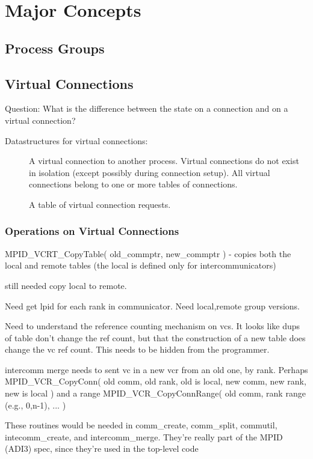 \documentclass{report}
\begin{document}
\section{Major Concepts}

\subsection{Process Groups}

\subsection{Virtual Connections}
Question: What is the difference between the state on a connection and
on a virtual connection?

Datastructures for virtual connections:
\begin{description}
\item[\texttt{MPIDI\_VC\_t]A virtual connection to another process.
Virtual connections do not exist in isolation (except possibly during
connection setup).  All virtual connections belong to one or more tables of
connections.
\item[\texttt{MPIDI\_VCR]A table of virtual connection requests.  
\end{description}

\subsubsection{Operations on Virtual Connections}
MPID\_VCRT\_CopyTable( old\_commptr, new\_commptr ) - copies both the
local and remote tables (the local is defined only for
intercommunicators)

still needed copy local to remote.

Need get lpid for each rank in communicator.  Need local,remote group
versions.

Need to understand the reference counting mechanism on vcs.  It looks
like dups of table don't change the ref count, but that the
construction of a new table does change the vc ref count.  This needs
to be hidden from the programmer.

intercomm merge needs to sent vc in a new vcr from an old one, by
rank.
Perhaps MPID\_VCR\_CopyConn( old comm, old rank, old is local, 
                             new comm, new rank, new is local )
and a range
        MPID\_VCR\_CopyConnRange( old comm, rank range (e.g., 0,n-1),
	... )

These routines would be needed in comm\_create, comm\_split, commutil,
intecomm\_create, and intercomm\_merge.  They're really part of the
MPID (ADI3) spec, since they're used in the top-level code
\end{document}
